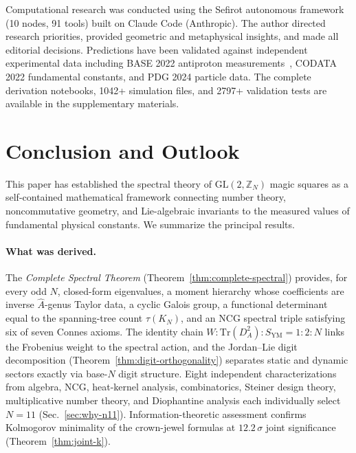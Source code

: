 \documentclass[aps,prd,twocolumn,superscriptaddress,floatfix,nofootinbib]{revtex4-2}
\theoremstyle{definition}
\theoremstyle{remark}
\begin{document}
\begin{acknowledgments}
Computational research was conducted using the Sefirot autonomous framework (10 nodes, 91 tools) built on Claude Code (Anthropic). The author directed research priorities, provided geometric and metaphysical insights, and made all editorial decisions. Predictions have been validated against independent experimental data including BASE 2022 antiproton measurements~\cite{base2022}, CODATA 2022 fundamental constants, and PDG 2024 particle data. The complete derivation notebooks, 1042+ simulation files, and 2797+ validation tests are available in the supplementary materials.
\end{acknowledgments}

\section{Conclusion and Outlook}
\label{sec:conclusion}

This paper has established the spectral theory of $\mathrm{GL}(2,\mathbb{Z}_N)$
magic squares as a self-contained mathematical framework connecting number theory,
noncommutative geometry, and Lie-algebraic invariants to the measured values of
fundamental physical constants.  We summarize the principal results.

\paragraph{What was derived.}
The \emph{Complete Spectral Theorem} (Theorem~\ref{thm:complete-spectral}) provides,
for every odd $N$, closed-form eigenvalues, a moment hierarchy whose coefficients
are inverse $\hat{A}$-genus Taylor data, a cyclic Galois group, a functional
determinant equal to the spanning-tree count $\tau(K_N)$, and an NCG spectral
triple satisfying six of seven Connes axioms.  The identity chain
$W : \mathrm{Tr}(D_A^2) : S_{\mathrm{YM}} = 1:2:N$ links the Frobenius weight
to the spectral action, and the Jordan--Lie digit decomposition
(Theorem~\ref{thm:digit-orthogonality}) separates static and dynamic sectors
exactly via base-$N$ digit structure.  Eight independent characterizations from
algebra, NCG, heat-kernel analysis, combinatorics, Steiner design theory,
multiplicative number theory, and Diophantine analysis each individually
select $N{=}11$ (Sec.~\ref{sec:why-n11}).  Information-theoretic assessment
confirms Kolmogorov minimality of the crown-jewel formulas at $12.2\,\sigma$
joint significance (Theorem~\ref{thm:joint-k}).
\end{document}
